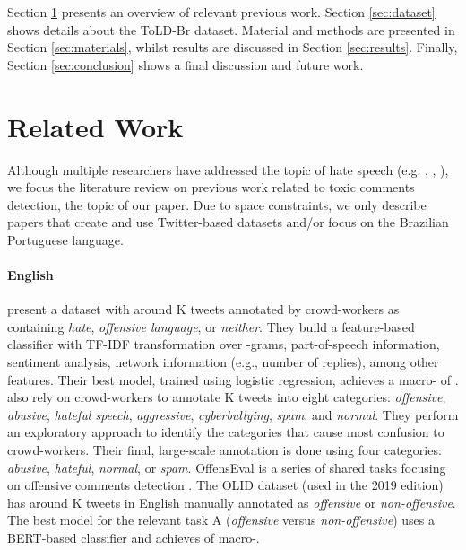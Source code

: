 \documentclass[11pt,a4paper]{article}
\begin{document}
Section \ref{sec:related} presents an overview of relevant previous work. Section \ref{sec:dataset} shows details about the ToLD-Br dataset. Material and methods are presented in Section \ref{sec:materials}, whilst results are discussed in Section \ref{sec:results}. Finally, Section \ref{sec:conclusion} shows a final discussion and future work. 


\section{Related Work} \label{sec:related}
Although multiple researchers have addressed the topic of hate speech (e.g. , , ), we focus the literature review on previous work related to toxic comments detection, the topic of our paper. 
Due to space constraints, we only describe papers that create and use Twitter-based datasets and/or focus on the Brazilian Portuguese language.

\paragraph{English}  present a dataset with around K tweets annotated by crowd-workers as containing \textit{hate}, \textit{offensive language}, or \textit{neither}. They build a feature-based classifier with TF-IDF transformation over -grams, part-of-speech information, sentiment analysis, network information (e.g., number of replies), among other features. Their best model, trained using logistic regression, achieves a macro- of . 
 also rely on crowd-workers to annotate K tweets into eight categories: \textit{offensive}, \textit{abusive}, \textit{hateful speech}, \textit{aggressive}, \textit{cyberbullying}, \textit{spam}, and \textit{normal}. They perform an exploratory approach to identify the categories that cause most confusion to crowd-workers. Their final, large-scale annotation is done using four categories: \textit{abusive}, \textit{hateful}, \textit{normal}, or \textit{spam}. OffensEval is a series of shared tasks focusing on offensive comments detection \cite{zampieri-etal-2019-semeval,zampieri-etal-2020-semeval}. The OLID dataset (used in the 2019 edition) has around K tweets in English manually annotated as \textit{offensive} or \textit{non-offensive}. The best model for the relevant task A (\textit{offensive} versus \textit{non-offensive}) uses a BERT-based classifier and achieves  of macro-.
\end{document}
